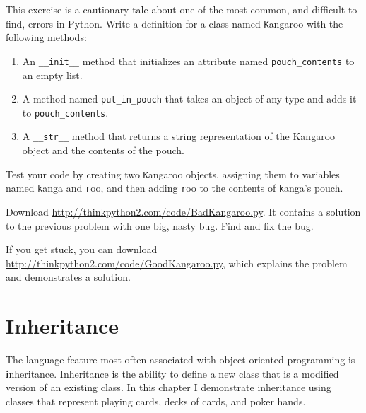 \documentclass[
DIV=11,
fontsize=12,
twoside,
headinclude=false,
titlepage=firstiscover,
abstract=true,
headsepline=true,
footsepline=true,
chapterprefix=true, %
headings=big,
bibliography=totoc,%
captions=tableheading
]{scrbook}
\theoremstyle{definition}
\begin{document}
\begin{exercise}
\normalfont
\label{kangaroo}

This exercise is a cautionary tale about one of the most
common, and difficult to find, errors in Python.
Write a definition for a class named {\texttt Kangaroo} with the following
methods:

\begin{enumerate}

\item An \verb"__init__" method that initializes an attribute named 
\verb"pouch_contents" to an empty list.

\item A method named \verb"put_in_pouch" that takes an object
of any type and adds it to \verb"pouch_contents".

\item A \verb"__str__" method that returns a string representation
of the Kangaroo object and the contents of the pouch.

\end{enumerate}
%
Test your code 
by creating two {\texttt Kangaroo} objects, assigning them to variables
named {\texttt kanga} and {\texttt roo}, and then adding {\texttt roo} to the
contents of {\texttt kanga}'s pouch.

Download \url{http://thinkpython2.com/code/BadKangaroo.py}.  It contains
a solution to the previous problem with one big, nasty bug.
Find and fix the bug.

If you get stuck, you can download
\url{http://thinkpython2.com/code/GoodKangaroo.py}, which explains the
problem and demonstrates a solution.

\end{exercise}



\chapter{Inheritance}

The language feature most often associated with object-oriented
programming is {\textbf inheritance}.  Inheritance is the ability to
define a new class that is a modified version of an existing class.
In this chapter I demonstrate inheritance using classes that represent
playing cards, decks of cards, and poker hands.
\end{document}
